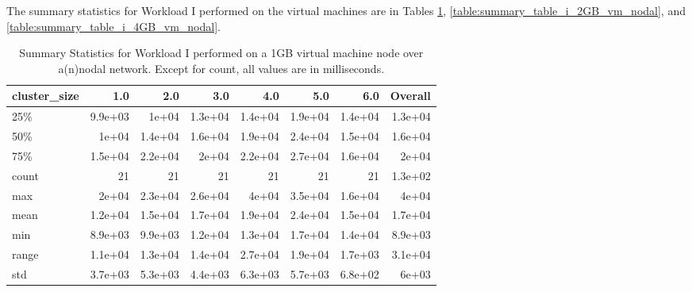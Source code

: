 The summary statistics for Workload I performed on the virtual machines are in Tables \ref{table:summary_table_i_1GB_vm_nodal}, \ref{table:summary_table_i_2GB_vm_nodal}, and \ref{table:summary_table_i_4GB_vm_nodal}.
\begin{table}
\begin{tabular}{lrrrrrrr}
\toprule
cluster\_size &     1.0 &     2.0 &     3.0 &     4.0 &     5.0 &     6.0 &  Overall \\
\midrule
25\%   & 9.9e+03 &   1e+04 & 1.3e+04 & 1.4e+04 & 1.9e+04 & 1.4e+04 &  1.3e+04 \\
50\%   &   1e+04 & 1.4e+04 & 1.6e+04 & 1.9e+04 & 2.4e+04 & 1.5e+04 &  1.6e+04 \\
75\%   & 1.5e+04 & 2.2e+04 &   2e+04 & 2.2e+04 & 2.7e+04 & 1.6e+04 &    2e+04 \\
count &      21 &      21 &      21 &      21 &      21 &      21 &  1.3e+02 \\
max   &   2e+04 & 2.3e+04 & 2.6e+04 &   4e+04 & 3.5e+04 & 1.6e+04 &    4e+04 \\
mean  & 1.2e+04 & 1.5e+04 & 1.7e+04 & 1.9e+04 & 2.4e+04 & 1.5e+04 &  1.7e+04 \\
min   & 8.9e+03 & 9.9e+03 & 1.2e+04 & 1.3e+04 & 1.7e+04 & 1.4e+04 &  8.9e+03 \\
range & 1.1e+04 & 1.3e+04 & 1.4e+04 & 2.7e+04 & 1.9e+04 & 1.7e+03 &  3.1e+04 \\
std   & 3.7e+03 & 5.3e+03 & 4.4e+03 & 6.3e+03 & 5.7e+03 & 6.8e+02 &    6e+03 \\
\bottomrule
\end{tabular}
\caption{Summary Statistics for Workload I performed on a 1GB virtual machine node over a(n)nodal network.  Except for count, all values are in milliseconds.}
\label{table:summary_table_i_1GB_vm_nodal}
\end{table}

